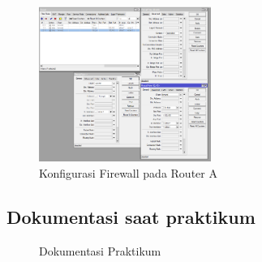 \begin{figure}[h]
    \centering
    \includegraphics[width=0.5\textwidth]{dokum/filter rule r1.png}
    \caption{Konfigurasi Firewall pada Router A}
    \label{fig:firewall-ra}
\end{figure}

\subsection{Dokumentasi saat praktikum}
\begin{figure}[h]
    \centering
    \caption{Dokumentasi Praktikum}
    \label{fig:dokum}
\end{figure}